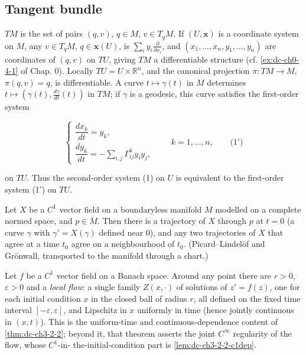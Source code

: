 \subsection{Tangent bundle}
$TM$ is the set of pairs $(q,v)$, $q\in M$, $v\in T_qM$. If $(U,\mathbf{x})$ is a
coordinate system on $M$, any $v\in T_qM$, $q\in\mathbf{x}(U)$, is
$\sum_i y_i\frac{\partial}{\partial x_i}$, and $(x_1,\dots,x_n,y_1,\dots,y_n)$ are
coordinates of $(q,v)$ on $TU$, giving $TM$ a differentiable structure (cf.
\cref{ex:dc-ch0-4-1} of Chap. 0). Locally $TU=U\times\mathbb{R}^n$, and the canonical
projection $\pi:TM\to M$, $\pi(q,v)=q$, is differentiable. A curve $t\mapsto\gamma(t)$
in $M$ determines $t\mapsto(\gamma(t),\frac{d\gamma}{dt}(t))$ in $TM$; if $\gamma$
is a geodesic, this curve satisfies the first-order system

$$
\begin{cases}\dfrac{dx_k}{dt}=y_k,\\[4pt]\dfrac{dy_k}{dt}=-\sum_{i,j}\Gamma_{ij}^k y_i y_j,\end{cases}\qquad k=1,\dots,n,\qquad\text{(1')}
$$

on $TU$. Thus the second-order system (1) on $U$ is equivalent to the first-order
system (1') on $TU$.

\begin{lemma}
  \label{lem:dc-ch3-2-2-pointwise}
  \mathlibok
  Let $X$ be a $C^1$ vector field on a boundaryless manifold $M$ modelled on a
  complete normed space, and $p\in M$. Then there is a trajectory of $X$ through
  $p$ at $t=0$ (a curve $\gamma$ with $\gamma'=X(\gamma)$ defined near $0$), and
  any two trajectories of $X$ that agree at a time $t_0$ agree on a
  neighbourhood of $t_0$. (Picard--Lindel\"of and Gr\"onwall, transported to the
  manifold through a chart.)
\end{lemma}

\begin{lemma}
  \label{lem:dc-ch3-2-2-flow}
  \mathlibok
  Let $f$ be a $C^1$ vector field on a Banach space. Around any point there are
  $r > 0$, $\varepsilon > 0$ and a \emph{local flow}: a single family
  $Z(x, \cdot)$ of solutions of $z' = f(z)$, one for each initial condition $x$
  in the closed ball of radius $r$, all defined on the fixed time interval
  $[-\varepsilon, \varepsilon]$, and Lipschitz in $x$ uniformly in time (hence
  jointly continuous in $(x, t)$). This is the uniform-time and
  continuous-dependence content of \cref{thm:dc-ch3-2-2}; beyond it, that
  theorem asserts the joint $C^\infty$ regularity of the flow, whose $C^1$-in-%
  the-initial-condition part is \cref{lem:dc-ch3-2-2-c1dep}.
\end{lemma}

